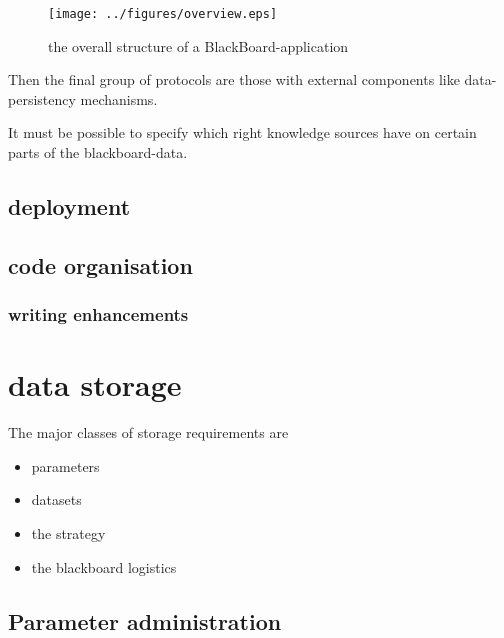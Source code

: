 \documentclass[]{lofar}
\begin{document}
      \begin{figure}
        \texttt{[image: ../figures/overview.eps]}
        \hypertarget{fig:overview}{}
        \caption{the overall structure of a BlackBoard-application\label{fig:overview}}
      \end{figure}

      Then the final group of protocols are those with external
      components like data-persistency mechanisms.

      \begin{requirement}
        It must be possible to specify which right knowledge sources
        have on certain parts of the blackboard-data.
        \caption{data access rights\label{req:data-access-rights}}
      \end{requirement}

    \subsection{deployment}

    \subsection{code organisation}

      \subsubsection{writing enhancements}

  \section{data storage}
  \label{sec:data-storage}\hypertarget{sec:data-storage}{}

    The major classes of storage requirements are

    \begin{itemize}
      \item parameters
      \item datasets
      \item the strategy
      \item the blackboard logistics
    \end{itemize}

    \subsection{Parameter administration}
    \label{subsec:parameter-administration}\hypertarget{subsec:parameter-administration}{}
\end{document}
